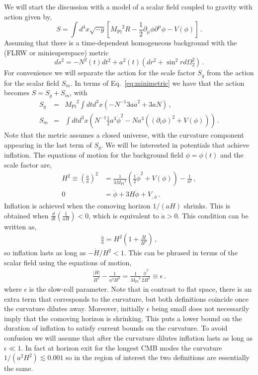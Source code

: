 \documentclass[a4paper,11pt]{article}
\numberwithin{equation}{section}
\newcommand{\mpl}{{M_{\mathrm{Pl}}}}
\numberwithin{equation}{section}
\begin{document}
We will start the discussion with a model of  a scalar field coupled to gravity with action given by,
\begin{equation}
S=\int d^4 x\sqrt{-g} \left[\mpl^2 R-\frac{1}{2}\partial_\mu\phi\partial^\mu\phi-V(\phi)\right] \,.
\end{equation}
Assuming that there is a time-dependent homogeneous background with the (FLRW or minisuperspace) metric 
\begin{equation}
ds^{2}=-N^{2}(t)dt^{2}+a^{2}(t)(dr^{2}+\sin^{2}rd\Omega_{2}^{2}) \,. \label{eq:minimetric}
\end{equation}
For convenience we will separate the action for the scale factor $S_g$ from the action for the scalar field $S_m$. In terms of Eq.~\eqref{eq:minimetric} we have that the action becomes $S=S_{g}+S_{m}$, 
with 
\begin{eqnarray}
S_{g} & = &\mpl^2\int dt d^3 x\left(-N^{-1}3a\dot{a}^{2}+3aN\right) \,,\label{eq:Sg}\\
S_{m} & = & \int dt d^3 x\left(N^{-1}\frac{1}{2}a^{3}\dot{\phi}^{2}-Na^{3}((\partial_i\phi)^2+V(\phi))\right) \,.
\end{eqnarray}
Note that the metric assumes a closed universe, with the curvature component appearing in the last term of $S_g$.
We will be interested in potentials that achieve inflation. The equations of motion for the background field $\phi=\phi(t)$ and the scale factor are,
\begin{align}
H^2\equiv\left(\frac{\dot a}{a}\right)^2&=\frac{1}{3\mpl^2}\left(\frac{1}{2}\dot\phi^2+V(\phi)\right)-\frac{1}{a^2} \,,\\
0&=\ddot\phi+3H\dot\phi+V_{,\phi} \,.
\end{align}
Inflation is achieved when the comoving horizon $1/(aH)$ shrinks. This is obtained when $\frac{d}{dt}\left(\frac{1}{aH}\right)<0$, which is equivalent to $\ddot a>0$. This condition can be written as,
\begin{align}
\frac{\ddot a}{a}=H^2\left(1+\frac{\dot H}{H^2}\right) \,,
\end{align}
so inflation lasts as long as $-\dot H/H^2 <1$. This can be phrased in terms of the scalar field using the equations of motion, 
 \begin{align}
 \label{eq:Epsilon}
\frac{\vert\dot H\vert}{H^2}-\frac{1}{a^2H^2}=\frac{1}{\mpl^2}\frac{\dot\phi^2}{2H^2} \equiv \epsilon \,.
 \end{align}
where $\epsilon$ is the slow-roll parameter. Note that in contrast to flat space, there is an extra term that corresponds to the curvature, but both definitions coincide once the curvature dilutes away. Moreover, initially  $\epsilon$ being small does not necessarily imply that the comoving horizon  is shrinking. This puts a  lower bound on the duration of inflation to satisfy current bounds on the curvature.   To avoid confusion  we will  assume that after the curvature dilutes inflation lasts as long as $\epsilon\ll 1$.
In fact at horizon exit for the longest CMB modes the curvature $1/(a^2H^2)\lesssim 0.001$ so  in the region of interest the two definitions are essentially the same.
\end{document}
